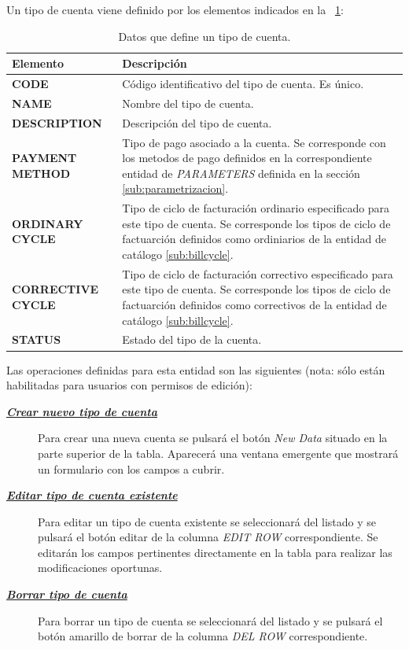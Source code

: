 Un tipo de cuenta viene definido por los elementos indicados en la \tablename~\ref{tab:tipo-cuenta}:



\begin{table}[H]
  \centering
  \setlength{\leftmargini}{0.4cm}
  \resizebox{14cm}{!} {
  \begin{tabular}{|m{4cm} m{11cm}|}
  \rowcolor{udcpink!25}
  \hline
  	\textbf{Elemento} & \textbf{Descripción} \\\hline
	\textbf{CODE} & Código identificativo del tipo de cuenta. Es único.   \\
	\textbf{NAME} & Nombre del tipo de cuenta. \\
	\textbf{DESCRIPTION} & Descripción del tipo de cuenta. \\	
	\textbf{PAYMENT METHOD} & Tipo de pago asociado a la cuenta. Se corresponde con los metodos de pago definidos en la correspondiente entidad de \emph{PARAMETERS} definida en la sección \ref{sub:parametrizacion}. \\	
	\textbf{ORDINARY CYCLE} & Tipo de ciclo de facturación ordinario especificado para este tipo de cuenta. Se corresponde los tipos de ciclo de factuarción definidos como ordiniarios de la entidad de catálogo \ref{sub:billcycle}. \\	 		\textbf{CORRECTIVE CYCLE} & Tipo de ciclo de facturación correctivo especificado para este tipo de cuenta. Se corresponde los tipos de ciclo de factuarción definidos como correctivos de la entidad de catálogo \ref{sub:billcycle}. \\	
	\textbf{STATUS} & Estado del tipo de la cuenta.
	\\\hline
  \end{tabular}
  } %
  \caption{Datos que define un tipo de cuenta.}
  \label{tab:tipo-cuenta}
\end{table}

Las operaciones definidas para esta entidad son las siguientes (nota: sólo están habilitadas para usuarios con permisos de edición):
\begin{description}
\item[\underline{\textsl{\textbf{Crear nuevo tipo de cuenta}}}] Para crear una nueva cuenta se pulsará el botón \textit{New Data} situado en la parte superior de la tabla. Aparecerá una ventana emergente que mostrará un formulario con los campos a cubrir.

\item[\underline{\textsl{\textbf{Editar tipo de cuenta existente}}}] Para editar un tipo de cuenta existente se seleccionará del listado y se pulsará el botón editar de la columna \textit{EDIT ROW} correspondiente. Se editarán los campos pertinentes directamente en la tabla para realizar las modificaciones oportunas.

\item[\underline{\textsl{\textbf{Borrar tipo de cuenta}}}] Para borrar un tipo de cuenta se seleccionará del listado y se pulsará el botón amarillo de borrar de la columna \textit{DEL ROW} correspondiente.
\end{description}

